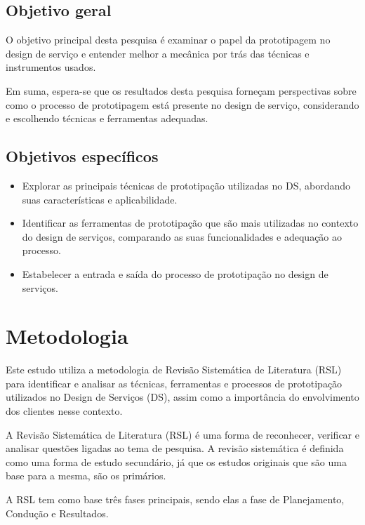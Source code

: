 \subsection{Objetivo geral}

O objetivo principal desta pesquisa é examinar o papel da prototipagem no design de serviço e entender melhor a mecânica por trás das técnicas e instrumentos usados.

Em suma, espera-se que os resultados desta pesquisa forneçam perspectivas sobre como o processo de prototipagem está presente no design de serviço, considerando e escolhendo técnicas e ferramentas adequadas.

\subsection{Objetivos específicos}

\begin{itemize}
	\item Explorar as principais técnicas de prototipação utilizadas no DS, abordando suas características e aplicabilidade.
	
	\item Identificar as ferramentas de prototipação que são mais utilizadas no contexto do design de serviços, comparando as suas funcionalidades e adequação ao processo.
	
	\item Estabelecer a entrada e saída do processo de prototipação no design de serviços.%
\end{itemize}

\section{Metodologia}

Este estudo utiliza a metodologia de Revisão Sistemática de Literatura (RSL) para identificar e analisar as técnicas, ferramentas e processos de prototipação utilizados no Design de Serviços (DS), assim como a importância do envolvimento dos clientes nesse contexto. 

A Revisão Sistemática de Literatura (RSL) é uma forma de reconhecer, verificar e analisar questões ligadas ao tema de pesquisa. A revisão sistemática é definida como uma forma de estudo secundário, já que os estudos originais que são uma base para a mesma, são os primários.

A RSL tem como base três fases principais, sendo elas a fase de Planejamento, Condução e Resultados.


